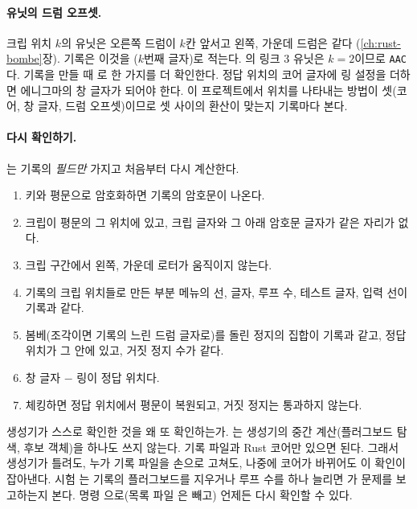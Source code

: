 \paragraph{유닛의 드럼 오프셋.} 크립 위치 $k$의 유닛은 오른쪽 드럼이 $k$칸 앞서고 왼쪽, 가운데 드럼은 같다
(\ref{ch:rust-bombe}장). 기록은 이것을 ($k$번째 글자)로 적는다. 의
링크 3 유닛은 $k=2$이므로 \texttt{AAC}다. 기록을 만들 때 로 한 가지를 더 확인한다. 정답 위치의 코어 글자에
링 설정을 더하면 에니그마의 창 글자가 되어야 한다. 이 프로젝트에서 위치를 나타내는 방법이 셋(코어, 창 글자, 드럼
오프셋)이므로 셋 사이의 환산이 맞는지 기록마다 본다.

\paragraph{다시 확인하기.} 는 기록의 \emph{필드만} 가지고 처음부터 다시 계산한다.

\begin{enumerate}
\item 키와 평문으로 암호화하면 기록의 암호문이 나온다.
\item 크립이 평문의 그 위치에 있고, 크립 글자와 그 아래 암호문 글자가 같은 자리가 없다.
\item 크립 구간에서 왼쪽, 가운데 로터가 움직이지 않는다.
\item 기록의 크립 위치들로 만든 부분 메뉴의 선, 글자, 루프 수, 테스트 글자, 입력 선이 기록과 같다.
\item 봄베(조각이면 기록의 느린 드럼 글자로)를 돌린 정지의 집합이 기록과 같고, 정답 위치가 그 안에 있고, 거짓 정지 수가
같다.
\item 창 글자 $-$ 링이 정답 위치다.
\item 체킹하면 정답 위치에서 평문이 복원되고, 거짓 정지는 통과하지 않는다.
\end{enumerate}

\Why 생성기가 스스로 확인한 것을 왜 또 확인하는가. 는 생성기의 중간 계산(플러그보드 탐색, 후보
객체)을 하나도 쓰지 않는다. 기록 파일과 Rust 코어만 있으면 된다. 그래서 생성기가 틀려도, 누가 기록 파일을 손으로
고쳐도, 나중에 코어가 바뀌어도 이 확인이 잡아낸다. 시험 는 기록의
플러그보드를 지우거나 루프 수를 하나 늘리면 가 문제를 보고하는지 본다. 명령
으로(목록 파일 은 빼고) 언제든 다시 확인할 수 있다.

